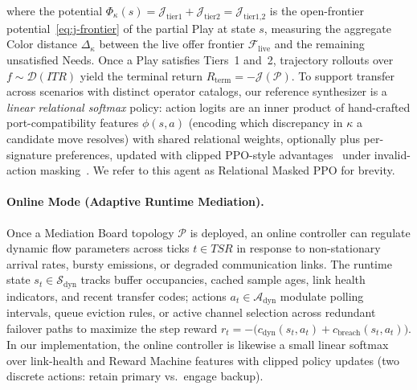 where the potential $\Phi_{\kappa}(s) = \mathcal{J}_{\text{tier1}} + \mathcal{J}_{\text{tier2}} = \mathcal{J}_{\text{tier1,2}}$ is the open-frontier potential~\eqref{eq:j-frontier} of the partial Play at state $s$, measuring the aggregate Color distance $\Delta_\kappa$ between the live offer frontier $\mathcal{F}_{\text{live}}$ and the remaining unsatisfied Needs.  Once a Play satisfies Tiers~1 and~2, trajectory rollouts over $f \sim \mathcal{D}(ITR)$ yield the terminal return $R_{\text{term}} = -\mathcal{J}(\mathcal{P})$.  To support transfer across scenarios with distinct operator catalogs, our reference synthesizer is a \emph{linear relational softmax} policy: action logits are an inner product of hand-crafted port-compatibility features $\phi(s, a)$ (encoding which discrepancy in $\kappa$ a candidate move resolves) with shared relational weights, optionally plus per-signature preferences, updated with clipped PPO-style advantages~\cite{Schulman2017PPO} under invalid-action masking~\cite{Huang2022Masking}.  We refer to this agent as Relational Masked PPO for brevity.

\paragraph{Online Mode (Adaptive Runtime Mediation).}
Once a Mediation Board topology $\mathcal{P}$ is deployed, an online controller can regulate dynamic flow parameters across ticks $t \in TSR$ in response to non-stationary arrival rates, bursty emissions, or degraded communication links.  The runtime state $s_t \in \mathcal{S}_{\text{dyn}}$ tracks buffer occupancies, cached sample ages, link health indicators, and recent transfer codes; actions $a_t \in \mathcal{A}_{\text{dyn}}$ modulate polling intervals, queue eviction rules, or active channel selection across redundant failover paths to maximize the step reward $r_t = -\big(c_{\text{dyn}}(s_t, a_t) + c_{\text{breach}}(s_t, a_t)\big)$.  In our implementation, the online controller is likewise a small linear softmax over link-health and Reward Machine features with clipped policy updates (two discrete actions: retain primary vs.\ engage backup).

